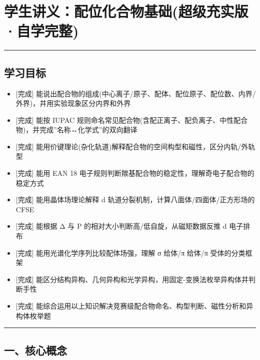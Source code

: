 \section{学生讲义：配位化合物基础(超级充实版·自学完整)}\label{ux5b66ux751fux8bb2ux4e49ux914dux4f4dux5316ux5408ux7269ux57faux7840ux8d85ux7ea7ux5145ux5b9eux7248ux81eaux5b66ux5b8cux6574}

\begin{center}\rule{0.5\linewidth}{0.5pt}\end{center}

\subsection{学习目标}\label{ux5b66ux4e60ux76eeux6807}

\begin{itemize}
\tightlist
\item
  {[}完成{]} 能说出配合物的组成(中心离子/原子、配体、配位原子、配位数、内界/外界)，并用实验现象区分内界和外界
\item
  {[}完成{]} 能按 IUPAC 规则命名常见配合物(含配正离子、配负离子、中性配合物)，并完成''名称↔化学式''的双向翻译
\item
  {[}完成{]} 能用价键理论(杂化轨道)解释配合物的空间构型和磁性，区分内轨/外轨型
\item
  {[}完成{]} 能用 EAN 18 电子规则判断羰基配合物的稳定性，理解奇电子配合物的稳定方式
\item
  {[}完成{]} 能用晶体场理论解释 d 轨道分裂机制，计算八面体/四面体/正方形场的 CFSE
\item
  {[}完成{]} 能根据 Δ 与 P 的相对大小判断高/低自旋，从磁矩数据反推 d 电子排布
\item
  {[}完成{]} 能用光谱化学序列比较配体场强，理解 σ 给体/π 给体/π 受体的分类框架
\item
  {[}完成{]} 能区分结构异构、几何异构和光学异构，用固定-变换法枚举异构体并判断手性
\item
  {[}完成{]} 能综合运用以上知识解决竞赛级配合物命名、构型判断、磁性分析和异构体枚举题
\end{itemize}

\begin{center}\rule{0.5\linewidth}{0.5pt}\end{center}

\subsection{一、核心概念}\label{ux4e00ux6838ux5fc3ux6982ux5ff5}

